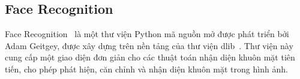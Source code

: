 \subsection{Face Recognition}


Face Recognition~\cite{facerecognition} là một thư viện Python mã nguồn mở được phát triển bởi Adam Geitgey, được xây dựng trên nền tảng của thư viện dlib~\cite{dlib}. Thư viện này cung cấp một giao diện đơn giản cho các thuật toán nhận diện khuôn mặt tiên tiến, cho phép phát hiện, căn chỉnh và nhận diện khuôn mặt trong hình ảnh.


    
    


